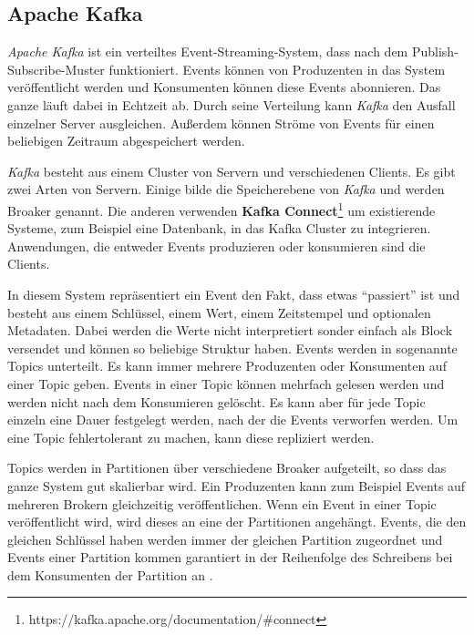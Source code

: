 \subsection{Apache Kafka}

\textit{Apache Kafka} ist ein verteiltes Event-Streaming-System, dass nach dem Publish-Subscribe-Muster funktioniert.
Events können von Produzenten in das System veröffentlicht werden und Konsumenten können diese Events abonnieren.
Das ganze läuft dabei in Echtzeit ab.
Durch seine Verteilung kann \textit{Kafka} den Ausfall einzelner Server ausgleichen.
Außerdem können Ströme von Events für einen beliebigen Zeitraum abgespeichert werden.

\textit{Kafka} besteht aus einem Cluster von Servern und verschiedenen Clients.
Es gibt zwei Arten von Servern.
Einige bilde die Speicherebene von \textit{Kafka} und werden Broaker genannt.
Die anderen verwenden \textbf{Kafka Connect}\footnote{https://kafka.apache.org/documentation/\#connect} um existierende Systeme, zum Beispiel eine Datenbank, in das Kafka Cluster zu integrieren.
Anwendungen, die entweder Events produzieren oder konsumieren sind die Clients.

In diesem System repräsentiert ein Event den Fakt, dass etwas "`passiert"' ist und besteht aus einem Schlüssel, einem Wert, einem Zeitstempel und optionalen Metadaten.
Dabei werden die Werte nicht interpretiert sonder einfach als Block versendet und können so beliebige Struktur haben.
Events werden in sogenannte Topics unterteilt.
Es kann immer mehrere Produzenten oder Konsumenten auf einer Topic geben.
Events in einer Topic können mehrfach gelesen werden und werden nicht nach dem Konsumieren gelöscht.
Es kann aber für jede Topic einzeln eine Dauer festgelegt werden, nach der die Events verworfen werden.
Um eine Topic fehlertolerant zu machen, kann diese repliziert werden.

Topics werden in Partitionen über verschiedene Broaker aufgeteilt, so dass das ganze System gut skalierbar wird.
Ein Produzenten kann zum Beispiel Events auf mehreren Brokern gleichzeitig veröffentlichen.
Wenn ein Event in einer Topic veröffentlicht wird, wird dieses an eine der Partitionen angehängt.
Events, die den gleichen Schlüssel haben werden immer der gleichen Partition zugeordnet und Events einer Partition kommen garantiert in der Reihenfolge des Schreibens bei dem Konsumenten der Partition an \parencite{kafka-docs}.